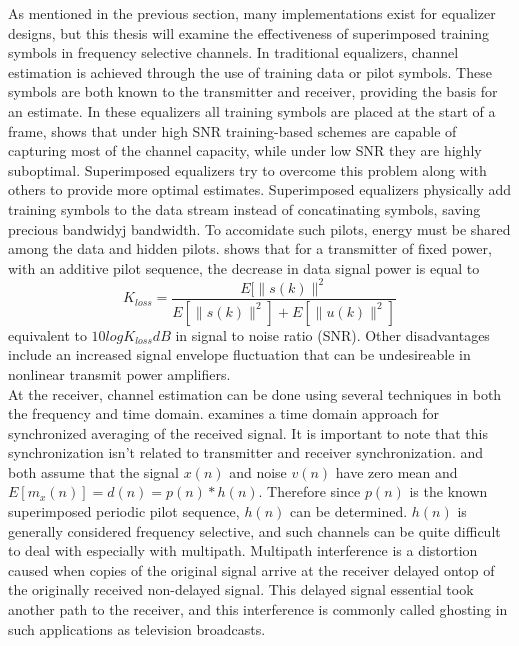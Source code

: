 As mentioned in the previous section, many implementations exist for equalizer designs, but this thesis will examine the effectiveness of superimposed training symbols in frequency selective channels.  In traditional equalizers, channel estimation is achieved through the use of training data or pilot symbols.  These symbols are both known to the transmitter and receiver, providing the basis for an estimate.  In these equalizers all training symbols are placed at the start of a frame,\cite{16} shows that under high SNR training-based schemes are capable of capturing most of the channel capacity, while under low SNR they are highly suboptimal.  Superimposed equalizers try to overcome this problem along with others to provide more optimal estimates.  Superimposed equalizers physically add training symbols to the data stream instead of concatinating symbols, saving precious bandwidyj bandwidth\cite{16}.  To accomidate such pilots, energy must be shared among the data and hidden pilots\cite{Ghogho}.  \cite{19} shows that for a transmitter of fixed power, with an additive pilot sequence, the decrease in data signal power is equal to \[ K_{loss}=\frac{E[\|s(k)\|^{2}}{E[\|s(k)\|^{2}]+E[\|u(k)\|^{2}]}\] equivalent to \(10logK_{loss}dB\) in signal to noise ratio (SNR).  Other disadvantages include an increased signal envelope fluctuation that can be undesireable in nonlinear transmit power amplifiers\cite{17}.\\  

At the receiver, channel estimation can be done using several techniques in both the frequency and time domain.  \cite{17} examines a time domain approach for synchronized averaging of the received signal.  It is important to note that this synchronization isn't related to transmitter and receiver synchronization.  \cite{17} and \cite{18} both assume that the signal \( x(n)\) and noise \( v(n) \) have zero mean and \(E[m_{x}(n)] = d(n) = p(n) \ast h(n)\).  Therefore since \(p(n) \) is the known superimposed periodic pilot sequence, \(h(n)\) can be determined.  \(h(n)\) is generally considered frequency selective, and such channels can be quite difficult to deal with especially with multipath.  Multipath interference is a distortion caused when copies of the original signal arrive at the receiver delayed ontop of the originally received non-delayed signal.  This delayed signal essential took another path to the receiver, and this interference is commonly called ghosting in such applications as television broadcasts\cite{ghost}.\\

